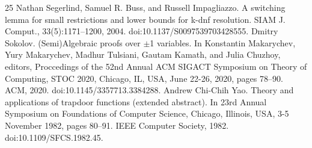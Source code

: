 \begin{thebibliography}{25}
 Nathan Segerlind, Samuel R. Buss, and Russell Impagliazzo. A switching lemma for small restrictions and lower bounds for k-dnf resolution. SIAM J. Comput., 33(5):1171–1200, 2004. doi:10.1137/S0097539703428555.
 Dmitry Sokolov. (Semi)Algebraic proofs over $\pm$1 variables. In Konstantin Makarychev, Yury Makarychev, Madhur Tulsiani, Gautam Kamath, and Julia Chuzhoy, editors, Proccedings of the 52nd Annual ACM SIGACT Symposium on Theory of Computing, STOC 2020, Chicago, IL, USA, June 22-26, 2020, pages 78–90. ACM, 2020. doi:10.1145/3357713.3384288.
 Andrew Chi-Chih Yao. Theory and applications of trapdoor functions (extended abstract). In 23rd Annual Symposium on Foundations of Computer Science, Chicago, Illinois, USA, 3-5 November 1982, pages 80–91. IEEE Computer Society, 1982. doi:10.1109/SFCS.1982.45.
\end{thebibliography}
